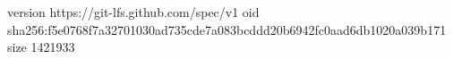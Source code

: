 version https://git-lfs.github.com/spec/v1
oid sha256:f5e0768f7a32701030ad735cde7a083bcddd20b6942fc0aad6db1020a039b171
size 1421933
